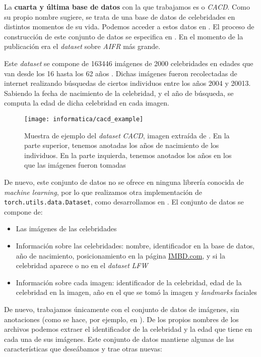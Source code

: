 La \textbf{cuarta y última base de datos} con la que trabajamos es  o \textit{CACD}. Como su propio nombre sugiere, se trata de una base de datos de celebridades en distintos momentos de su vida. Podemos acceder a estos datos en \cite{informatica:cacd_dataset}. El proceso de construcción de este conjunto de datos se especifica en \cite{informatica:paper_cacd}. En el momento de la publicación era el \textit{dataset} sobre \textit{AIFR} más grande.

Este \textit{dataset} se compone de 163446 imágenes de 2000 celebridades en edades que van desde los 16 hasta los 62 años \cite{informatica:paper_cacd}. Dichas imágenes fueron recolectadas de internet realizando búsquedas de ciertos individuos entre los años 2004 y 20013. Sabiendo la fecha de nacimiento de la celebridad, y el año de búsqueda, se computa la edad de dicha celebridad en cada imagen.

\begin{figure}[H]
    \centering
    \texttt{[image: informatica/cacd\_example]}
    \caption{Muestra de ejemplo del \textit{dataset} \textit{CACD}, imagen extraída de \cite{informatica:paper_cacd}. En la parte superior, tenemos anotadas los años de nacimiento de los individuos. En la parte izquierda, tenemos anotados los años en los que las imágenes fueron tomadas}
    \label{img:cacd_imagenes_ejemplo}
\end{figure}

De nuevo, este conjunto de datos no se ofrece en ninguna librería conocida de \textit{machine learning}, por lo que realizamos otra implementación de \lstinline{torch.utils.data.Dataset}, como desarrollamos en . El conjunto de datos se compone de:

\begin{itemize}
    \item Las imágenes de las celebridades
    \item Información sobre las celebridades: nombre, identificador en la base de datos, año de nacimiento, posicionamiento en la página \url{IMBD.com}, y si la celebridad aparece o no en el \textit{dataset} \textit{LFW}
    \item Información sobre cada imagen: identificador de la celebridad, edad de la celebridad en la imagen, año en el que se tomó la imagen y \textit{landmarks} faciales
\end{itemize}

De nuevo, trabajamos únicamente con el conjunto de datos de imágenes, sin anotaciones (como se hace, por ejemplo, en \cite{informatica:facenet}). De los propios nombres de los archivos podemos extraer el identificador de la celebridad y la edad que tiene en cada una de sus imágenes. Este conjunto de datos mantiene algunas de las características que deseábamos y trae otras nuevas:

